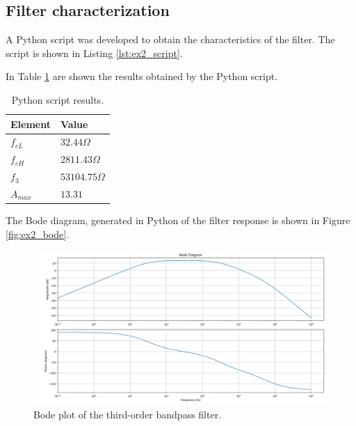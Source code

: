 \subsection{Filter characterization}
A Python script was developed to obtain the characteristics of the filter. The script is shown in Listing \ref{lst:ex2_script}.



In Table \ref{tab:script_results} are shown the results obtained by the Python script.

\begin{table}[h]
    \centering
    \caption{Python script results.}
    \begin{tabularx}{\textwidth}{>{\centering\arraybackslash}X >{\centering\arraybackslash}X}
        \toprule
        \textbf{Element} & \textbf{Value}\\
        \midrule
        $f_{cL}$ & $32.44\Omega$\\ \midrule
        $f_{cH}$ &  $2811.43\Omega$ \\ \midrule
        $f_{3}$ &  $53104.75\Omega$ \\ \midrule
        $A_{max}$ & $13.31$ \\
        \bottomrule
    \end{tabularx}
    \label{tab:script_results}
\end{table}

The Bode diagram, generated in Python of the filter response is shown in Figure \ref{fig:ex2_bode}. 
\begin{figure}[H]
    \centering
    \includegraphics[width=1\linewidth]{images/bode_ex2_python.png}
    \caption{Bode plot of the third-order bandpass filter.}
    \label{fig:ex2_bode_python}
\end{figure}

